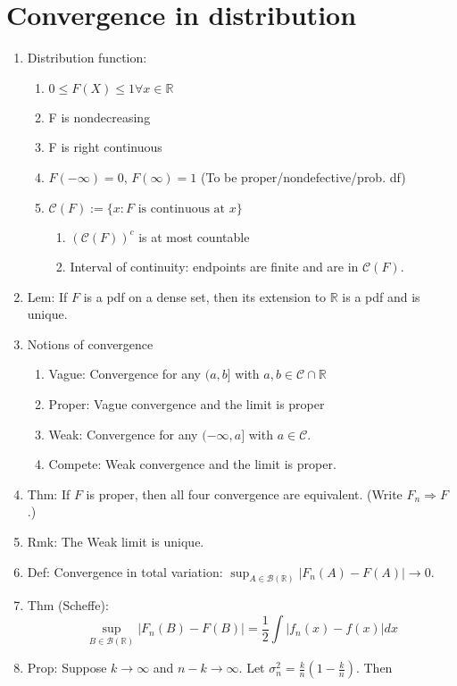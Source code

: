 \documentclass{article}
\newcommand{\R}{\mathbb{R}}
\newcommand{\C}{\mathcal{C}}
\newcommand{\B}{\mathcal{B}}
\begin{document}
\section{Convergence in distribution}

\begin{enumerate}
\item Distribution function:
  \begin{enumerate}
  \item $0 \leq F(X) \leq 1 \forall x \in \R$
  \item F is nondecreasing
  \item F is right continuous
  \item $F(-\infty) = 0$, $F(\infty) = 1$ (To be
    proper/nondefective/prob. df)
  \item $\C(F) := \{x: \text{$F$ is continuous at $x$}\}$
    \begin{enumerate}
    \item $(\C(F))^c$ is at most countable
    \item Interval of continuity: endpoints are finite and are in
      $\C(F)$.
    \end{enumerate}
  \end{enumerate}
\item Lem: If $F$ is a pdf on a dense set, then its extension to $\R$
  is a pdf and is unique.
\item Notions of convergence
  \begin{enumerate}
  \item Vague: Convergence for any $(a, b]$ with $a, b \in \C \cap \R$
  \item Proper: Vague convergence and the limit is proper
  \item Weak: Convergence for any $(-\infty, a]$ with $a \in \C$.
  \item Compete: Weak convergence and the limit is proper.
  \end{enumerate}
\item Thm: If $F$ is proper, then all four convergence are
  equivalent. (Write $F_n \Rightarrow F$.)
\item Rmk: The Weak limit is unique.
\item Def: Convergence in total variation:
  $\sup_{A \in \B(\R)} |F_n(A) - F(A)| \to 0$.
\item Thm (Scheffe):
  \[
    \sup_{B \in \B(\R)} |F_n(B) - F(B)| = \frac{1}{2} \int |f_n(x) -
    f(x)| dx
  \]
\item Prop: Suppose $k \to \infty$ and $n-k \to \infty$. Let
  $\sigma_n^2 = \frac{k}{n}(1-\frac{k}{n})$.  Then

\end{enumerate}
\end{document}
